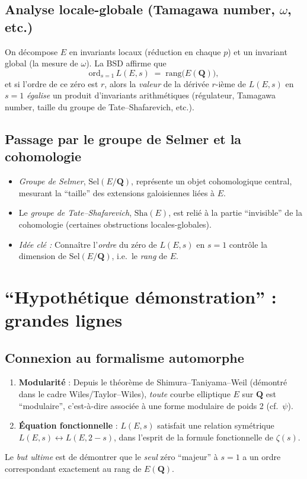 \documentclass[11pt]{article}
\newcommand{\Sh}{\mathrm{Sha}}
\begin{document}
\subsection{Analyse locale-globale (Tamagawa number, $\omega$, etc.)}
On décompose $E$ en invariants locaux (réduction en chaque $p$) et un invariant global (la mesure de $\omega$). La BSD affirme que
\[
  \mathrm{ord}_{s=1}\,L(E,s)
  \;=\;
  \mathrm{rang}\bigl(E(\mathbf{Q})\bigr),
\]
et si l'ordre de ce zéro est $r$, alors la \emph{valeur} de la dérivée $r$-ième de $L(E,s)$ en $s=1$ \emph{égalise} un produit d'invariants arithmétiques (régulateur, Tamagawa number, taille du groupe de Tate--Shafarevich, etc.).

\subsection{Passage par le groupe de Selmer et la cohomologie}
\begin{itemize}
  \item \emph{Groupe de Selmer}, $\mathrm{Sel}(E/\mathbf{Q})$, représente un objet cohomologique central, mesurant la “taille” des extensions galoisiennes liées à $E$.
  \item Le \emph{groupe de Tate--Shafarevich}, $\Sh(E)$, est relié à la partie “invisible” de la cohomologie (certaines obstructions locales-globales).
  \item \emph{Idée clé :} Connaître l'\emph{ordre} du zéro de $L(E,s)$ en $s=1$ contrôle la dimension de $\mathrm{Sel}(E/\mathbf{Q})$, i.e.\ le \emph{rang} de $E$. 
\end{itemize}

\section{“Hypothétique démonstration” : grandes lignes}

\subsection{Connexion au formalisme automorphe}
\begin{enumerate}
  \item \textbf{Modularité} : Depuis le théorème de Shimura--Taniyama--Weil (démontré dans le cadre Wiles/Taylor--Wiles), \emph{toute} courbe elliptique $E$ sur $\mathbf{Q}$ est “modulaire”, c'est-à-dire associée à une forme modulaire de poids 2 (cf.\ $\psi$).
  \item \textbf{Équation fonctionnelle} : $L(E,s)$ satisfait une relation symétrique $L(E,s) \leftrightarrow L(E,2-s)$, dans l'esprit de la formule fonctionnelle de $\zeta(s)$. 
\end{enumerate}
Le \emph{but ultime} est de démontrer que le \emph{seul} zéro ``majeur'' à $s=1$ a un ordre correspondant exactement au rang de $E(\mathbf{Q})$.
\end{document}
